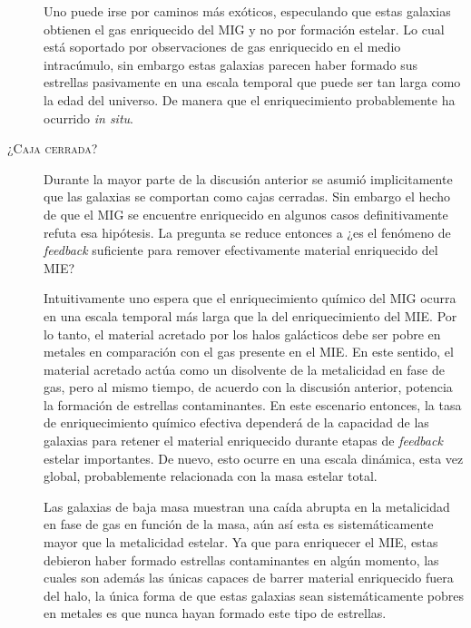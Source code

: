 \documentclass{article}
\begin{document}
\begin{description}
Uno puede irse por caminos más exóticos, especulando que estas galaxias obtienen el gas enriquecido
del MIG y no por formación estelar. Lo cual está soportado por observaciones de gas enriquecido en
el medio intracúmulo, sin embargo estas galaxias parecen haber formado sus estrellas pasivamente en
una escala temporal que puede ser tan larga como la edad del universo. De manera que el
enriquecimiento probablemente ha ocurrido \emph{in situ}.
%
\item[\textsc{¿Caja cerrada?}] Durante la mayor parte de la discusión anterior se asumió
implicitamente que las galaxias se comportan como cajas cerradas. Sin embargo el hecho de que el MIG
se encuentre enriquecido en algunos casos definitivamente refuta esa hipótesis. La pregunta se
reduce entonces a ¿es el fenómeno de \emph{feedback} suficiente para remover efectivamente material
enriquecido del MIE?

Intuitivamente uno espera que el enriquecimiento químico del MIG ocurra en una escala temporal más
larga que la del enriquecimiento del MIE. Por lo tanto, el material acretado por los halos
galácticos debe ser pobre en metales en comparación con el gas presente en el MIE. En este sentido,
el material acretado actúa como un disolvente de la metalicidad en fase de gas, pero al mismo
tiempo, de acuerdo con la discusión anterior, potencia la formación de estrellas contaminantes. En
este escenario entonces, la tasa de enriquecimiento químico efectiva dependerá de la capacidad de
las galaxias para retener el material enriquecido durante etapas de \emph{feedback} estelar
importantes. De nuevo, esto ocurre en una escala dinámica, esta vez global, probablemente
relacionada con la masa estelar total.

Las galaxias de baja masa muestran una caída abrupta en la metalicidad en fase de gas en función de
la masa, aún así esta es sistemáticamente mayor que la metalicidad estelar. Ya que para enriquecer
el MIE, estas debieron haber formado estrellas contaminantes en algún momento, las cuales son además
las únicas capaces de barrer material enriquecido fuera del halo, la única forma de que estas
galaxias sean sistemáticamente pobres en metales es que nunca hayan formado este tipo de estrellas.
%
\end{description}


\end{document}
